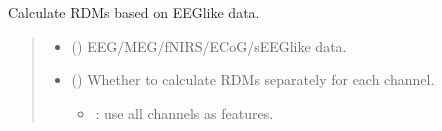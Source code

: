 \documentclass[letterpaper,10pt,english]{sphinxhowto}
\begin{document}
\begin{fulllineitems}
\label{\detokenize{rdm_cal:neurora.rdm_cal.eegRDM}}
\pysigstartsignatures
{}
\pysigstopsignatures
\sphinxAtStartPar
Calculate RDMs based on EEG\sphinxhyphen{}like data.
\begin{quote}\begin{description}
\begin{itemize}
\item {} 
\sphinxAtStartPar
{} (\sphinxstyleliteralemphasis{\sphinxupquote{, }}\sphinxstyleliteralemphasis{\sphinxupquote{ {[}}}\sphinxstyleliteralemphasis{\sphinxupquote{, }}\sphinxstyleliteralemphasis{\sphinxupquote{, }}\sphinxstyleliteralemphasis{\sphinxupquote{, }}\sphinxstyleliteralemphasis{\sphinxupquote{, }}\sphinxstyleliteralemphasis{\sphinxupquote{{]}}}) \textendash{} EEG/MEG/fNIRS/ECoG/sEEG\sphinxhyphen{}like data.

\item {} 
\sphinxAtStartPar
{} (\sphinxstyleliteralemphasis{\sphinxupquote{, }}\sphinxstyleliteralemphasis{\sphinxupquote{, }}) \textendash{} 
\sphinxAtStartPar
Whether to calculate RDMs separately for each channel.
\begin{itemize}
\item {} 
: use all channels as features.


\end{itemize}
\end{itemize}
\end{description}
\end{quote}
\end{fulllineitems}
\end{document}
